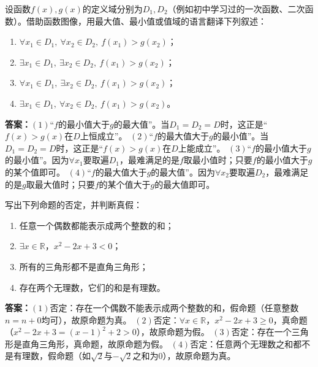 \begin{exercise}
设函数$f(x),g(x)$的定义域分别为$D_1,D_2$（例如初中学习过的一次函数、二次函数）。借助函数图像，用最大值、最小值或值域的语言翻译下列叙述：
\begin{enumerate}
    \item $\forall x_1\in D_1,\ \forall x_2\in D_2,\ f(x_1)>g(x_2)$；
    \item $\exists x_1\in D_1,\ \exists x_2\in D_2,\ f(x_1)>g(x_2)$；
    \item $\forall x_1\in D_1,\ \exists x_2\in D_2,\ f(x_1)>g(x_2)$；
    \item $\exists x_1\in D_1,\ \forall x_2\in D_2,\ f(x_1)>g(x_2)$。
\end{enumerate}
\end{exercise}
\textbf{答案：}$(1)$“$f$的最小值大于$g$的最大值”。当$D_1=D_2=D$时，这正是“$f(x)>g(x)$在$D$上恒成立”。
$(2)$“$f$的最大值大于$g$的最小值”。当$D_1=D_2=D$时，这正是“$f(x)>g(x)$在$D$上能成立”。
$(3)$“$f$的最小值大于$g$的最小值”。因为$\forall x_1$要取遍$D_1$，最难满足的是$f$取最小值时；只要$f$的最小值大于$g$的某个值即可。
$(4)$“$f$的最大值大于$g$的最大值”。因为$\forall x_2$要取遍$D_2$，最难满足的是$g$取最大值时；只要$f$的某个值大于$g$的最大值即可。

\begin{exercise}
写出下列命题的否定，并判断真假：
\begin{enumerate}
    \item 任意一个偶数都能表示成两个整数的和；
    \item $\exists x\in\mathbb{R}$，$x^2-2x+3<0$；
    \item 所有的三角形都不是直角三角形；
    \item 存在两个无理数，它们的和是有理数。
\end{enumerate}
\end{exercise}
\textbf{答案：}$(1)$否定：存在一个偶数不能表示成两个整数的和，假命题（任意整数$n=n+0$均可），故原命题为真。
$(2)$否定：$\forall x\in\mathbb{R}$，$x^2-2x+3\geq 0$，真命题（$x^2-2x+3=(x-1)^2+2>0$），故原命题为假。
$(3)$否定：存在一个三角形是直角三角形，真命题，故原命题为假。
$(4)$否定：任意两个无理数之和都不是有理数，假命题（如$\sqrt{2}$与$-\sqrt{2}$之和为$0$），故原命题为真。

